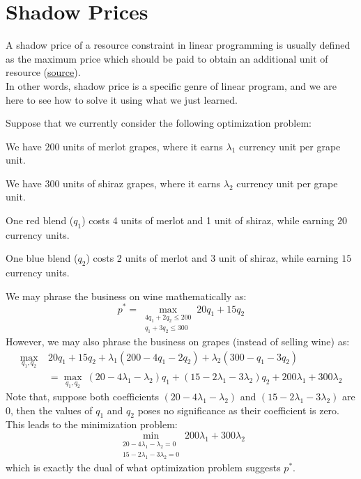 \section{Shadow Prices}
A shadow price of a resource constraint in linear programming is usually defined as the maximum price which should be paid to obtain an additional unit of resource
(\href{https://pubsonline.informs.org/doi/pdf/10.1287/inte.12.2.61#:~:text=A%20shadow%20price%20of%20a,additional%20unit%20of%20re%2D%20source.}{source}). \\
In other words, shadow price is a specific genre of linear program, and we are here to see how to solve it using what we just learned.

Suppose that we currently consider the following optimization problem:
\begin{bindenum}
    \item We have $200$ units of merlot grapes, where it earns $\lambda_1$ currency unit per grape unit.
    \item We have $300$ units of shiraz grapes, where it earns $\lambda_2$ currency unit per grape unit.
    \item One red blend ($q_1$) costs 4 units of merlot and 1 unit of shiraz, while earning $20$ currency units.
    \item One blue blend ($q_2$) costs 2 units of merlot and 3 unit of shiraz, while earning $15$ currency units.
\end{bindenum}
We may phrase the business on wine mathematically as:
\[
    p^* = \max_{
        \substack{
            4q_1 + 2q_2 \leq 200 \\
            q_1 + 3q_2 \leq 300
        }
    } 20 q_1 + 15 q_2
\]
However, we may also phrase the business on grapes (instead of selling wine) as:
\begin{align*}
    \max_{q_1, q_2}\ &20q_1 + 15q_2 + \lambda_1 (200 - 4q_1 - 2q_2) + \lambda_2 (300 - q_1 - 3q_2) \\
    &= \max_{q_1, q_2}\ (20 - 4\lambda_1 - \lambda_2) q_1 + (15 - 2 \lambda_1 - 3 \lambda_2) q_2 + 200 \lambda_1 + 300 \lambda_2
\end{align*}
Note that, suppose both coefficients $(20 - 4\lambda_1 - \lambda_2)$ and $(15 - 2 \lambda_1 - 3 \lambda_2)$ are $0$, then the values of $q_1$ and $q_2$ poses no significance as their coefficient is zero. \\
This leads to the minimization problem:
\[
    \min_{
        \substack{
            20 - 4\lambda_1 - \lambda_2 = 0 \\
            15 - 2 \lambda_1 - 3 \lambda_2 = 0
        }
    } 200 \lambda_1 + 300 \lambda_2
\]
which is exactly the dual of what optimization problem suggests $p^*$.
